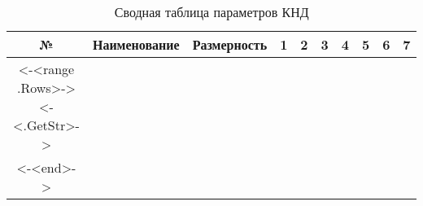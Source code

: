 \begin{landscape}
	\begin{center}
		\begin{longtable}{|c|c|c|c|c|c|c|c|c|c|}
			\hline
			\textbf{№} & 
			\textbf{Наименование} & 
			\textbf{Размерность} & 
			\textbf{1} & 
			\textbf{2} &
			\textbf{3} &
			\textbf{4} &
			\textbf{5} &
			\textbf{6} &
			\textbf{7} \\\hline
			\endhead
			<-<range .Rows>->
				<-<.GetStr>-> \\\hline
			<-<end>->
		\caption{Сводная таблица параметров КНД} \label{tab:lpc-stage-total}
		\end{longtable}
	\end{center}
\end{landscape}
